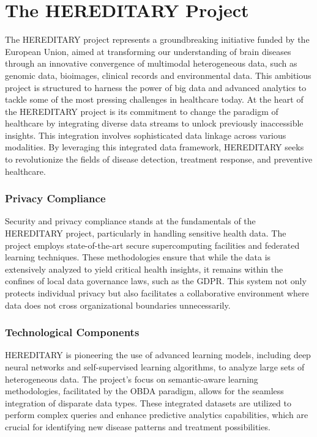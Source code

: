 \section{The HEREDITARY Project}

The \ac{HEREDITARY} project represents a groundbreaking initiative funded by the European Union, aimed at transforming our understanding of brain diseases through an innovative convergence of multimodal heterogeneous data, such as genomic data, bioimages, clinical records and environmental data. This ambitious project is structured to harness the power of big data and advanced analytics to tackle some of the most pressing challenges in healthcare today.
At the heart of the \ac{HEREDITARY} project is its commitment to change the paradigm of healthcare by integrating diverse data streams to unlock previously inaccessible insights. This integration involves sophisticated data linkage across various modalities. By leveraging this integrated data framework, \ac{HEREDITARY} seeks to revolutionize the fields of disease detection, treatment response, and preventive healthcare.
\subsubsection{Privacy Compliance}
Security and privacy compliance stands at the fundamentals of the \ac{HEREDITARY} project, particularly in handling sensitive health data. The project employs state-of-the-art secure supercomputing facilities and federated learning techniques. These methodologies ensure that while the data is extensively analyzed to yield critical health insights, it remains within the confines of local data governance laws, such as the \ac{GDPR}. This system not only protects individual privacy but also facilitates a collaborative environment where data does not cross organizational boundaries unnecessarily.
\subsubsection{Technological Components}
\ac{HEREDITARY} is pioneering the use of advanced learning models, including deep neural networks and self-supervised learning algorithms, to analyze large sets of heterogeneous data. The project's focus on semantic-aware learning methodologies, facilitated by the \ac{OBDA} paradigm, allows for the seamless integration of disparate data types. These integrated datasets are utilized to perform complex queries and enhance predictive analytics capabilities, which are crucial for identifying new disease patterns and treatment possibilities.
